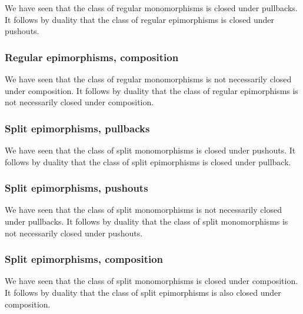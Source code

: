 We have seen that the class of regular monomorphisms is closed under pullbacks.
It follows by duality that the class of regular epimorphisms is closed under pushouts.



\subsubsection*{Regular epimorphisms, composition}

We have seen that the class of regular monomorphisms is not necessarily closed under composition.
It follows by duality that the class of regular epimorphisms is not necessarily closed under composition.



\subsubsection*{Split epimorphisms, pullbacks}

We have seen that the class of split monomorphisms is closed under pushouts.
It follows by duality that the class of split epimorphisms is closed under pullback.



\subsubsection*{Split epimorphisms, pushouts}

We have seen that the class of split monomorphisms is not necessarily closed under pullbacks.
It follows by duality that the class of split monomorphisms is not necessarily closed under pushouts.



\subsubsection*{Split epimorphisms, composition}

We have seen that the class of split monomorphisms is closed under composition.
It follows by duality that the class of split epimorphisms is also closed under composition.
